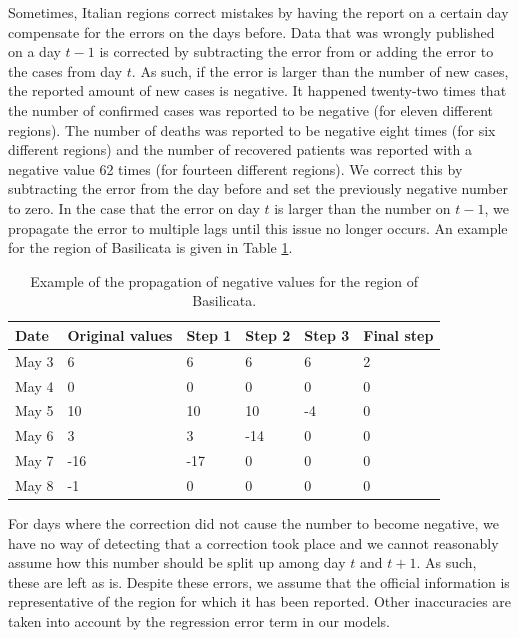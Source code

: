 \documentclass[12pt]{article}
\begin{document}
	Sometimes, Italian regions correct mistakes by having the report on a certain day compensate for the errors on the days before. Data that was wrongly published on a day $t-1$ is corrected by subtracting the error from or adding the error to the cases from day $t$. As such, if the error is larger than the number of new cases, the reported amount of new cases is negative. It happened twenty-two times that the number of confirmed cases was reported to be negative (for eleven different regions). The number of deaths was reported to be negative eight times (for six different regions) and the number of recovered patients was reported with a negative value 62 times (for fourteen different regions). We correct this by subtracting the error from the day before and set the previously negative number to zero. In the case that the error on day $t$ is larger than the number on $t-1$, we propagate the error to multiple lags until this issue no longer occurs. An example for the region of Basilicata is given in Table \ref{tab:example_propagation_negative_values}.
	
	\begin{table}[H]
		\centering
		\caption{Example of the propagation of negative values for the region of Basilicata.}
		\label{tab:example_propagation_negative_values}
		\begin{tabular}{llllll}
			\toprule
			Date    & Original values   & Step 1 & Step 2 & Step 3 & Final step \\ \midrule
            May 3   & 6                 & 6      & 6      & 6      & 2          \\
            May 4   & 0                 & 0      & 0      & 0      & 0          \\
            May 5   & 10                & 10     & 10     & -4     & 0          \\
            May 6   & 3                 & 3      & -14    & 0      & 0          \\
            May 7   & -16               & -17    & 0      & 0      & 0          \\
            May 8   & -1                & 0      & 0      & 0      & 0          \\ \bottomrule
		\end{tabular}
	\end{table}
	
	For days where the correction did not cause the number to become negative, we have no way of detecting that a correction took place and we cannot reasonably assume how this number should be split up among day $t$ and $t+1$. As such, these are left as is. Despite these errors, we assume that the official information is representative of the region for which it has been reported. Other inaccuracies are taken into account by the regression error term in our models.
	\\
	
\end{document}
